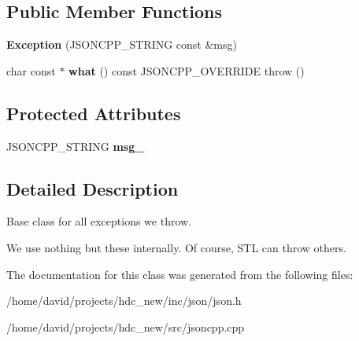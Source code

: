 \subsection*{Public Member Functions}
\begin{DoxyCompactItemize}
\item 
{\bfseries Exception} (J\+S\+O\+N\+C\+P\+P\+\_\+\+S\+T\+R\+I\+NG const \&msg)\hypertarget{class_json_1_1_exception_ae764aa42e0755bd4ce9d303e2733fa8f}{}\label{class_json_1_1_exception_ae764aa42e0755bd4ce9d303e2733fa8f}

\item 
char const $\ast$ {\bfseries what} () const J\+S\+O\+N\+C\+P\+P\+\_\+\+O\+V\+E\+R\+R\+I\+DE  throw ()\hypertarget{class_json_1_1_exception_a5a9ed7d91b828b9be81706ef9d483ed6}{}\label{class_json_1_1_exception_a5a9ed7d91b828b9be81706ef9d483ed6}

\end{DoxyCompactItemize}
\subsection*{Protected Attributes}
\begin{DoxyCompactItemize}
\item 
J\+S\+O\+N\+C\+P\+P\+\_\+\+S\+T\+R\+I\+NG {\bfseries msg\+\_\+}\hypertarget{class_json_1_1_exception_aae3cbb8b45bf21480f64502a8329659f}{}\label{class_json_1_1_exception_aae3cbb8b45bf21480f64502a8329659f}

\end{DoxyCompactItemize}


\subsection{Detailed Description}
Base class for all exceptions we throw.

We use nothing but these internally. Of course, S\+TL can throw others. 

The documentation for this class was generated from the following files\+:\begin{DoxyCompactItemize}
\item 
/home/david/projects/hdc\+\_\+new/inc/json/json.\+h\item 
/home/david/projects/hdc\+\_\+new/src/jsoncpp.\+cpp\end{DoxyCompactItemize}
